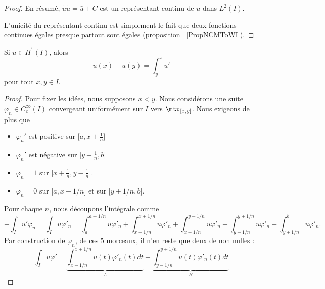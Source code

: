 \begin{proof}
        En résumé, \( \tilde u\tilde u=\bar u+C\) est un représentant continu de \( u\) dans \( L^2(I)\).

        L'unicité du représentant continu est simplement le fait que deux fonctions continues égales presque partout sont égales (proposition ~\ref{PropNCMToWI}).

\end{proof}

\begin{proposition}     \label{PropGWOIoDg}
    Si \( u\in H^1(I)\), alors
    \begin{equation}
        u(x)-u(y)=\int_y^xu'
    \end{equation}
    pour tout \( x,y\in I\).
\end{proposition}

\begin{proof}
    Pour fixer les idées, nous supposons \( x<y\). Nous considérons une suite \( \varphi_n\in C^{\infty}_c(I)\) convergeant uniformément sur \( I\) vers \( \mtu_{\mathopen[ x , y \mathclose]}\). Nous exigeons de plus que
    \begin{itemize}
        \item
        \( \varphi_n'\) est positive sur \( \mathopen[ a , x+\frac{1}{ n } \mathclose]\)
    \item
        \( \varphi_n'\) est négative sur \( \mathopen[ y-\frac{1}{ n } , b \mathclose]\)
    \item
        \( \varphi_n=1\) sur \( \mathopen[ x+\frac{1}{ n } , y-\frac{1}{ n } \mathclose]\).
    \item
        \( \varphi_n=0\) sur \( \mathopen[ a , x-1/n \mathclose]\) et sur \( \mathopen[ y+1/n , b \mathclose]\).
    \end{itemize}
    Pour chaque \( n\), nous découpons l'intégrale comme
    \begin{equation}        \label{EqRPwqpve}
        -\int_Iu'\varphi_n=\int_Iu\varphi'_n=\int_a^{a-1/n}u\varphi'_n+\int_{x-1/n}^{x+1/n}u\varphi'_n+\int_{x+1/n}^{y-1/n}u\varphi'_n+\int_{y-1/n}^{y+1/n}u\varphi'_n+\int_{y+1/n}^{b}u\varphi'_n.
    \end{equation}
    Par construction de \( \varphi_n\), de ces \( 5\) morceaux, il n'en reste que deux de non nulles :
    \begin{equation}
        \int_Iu\varphi'=\underbrace{\int_{x-1/n}^{x+1/n}u(t)\varphi'_n(t)dt}_A+\underbrace{\int_{y-1/n}^{y+1/n}u(t)\varphi'_n(t)dt}_B
    \end{equation}


\end{proof}
